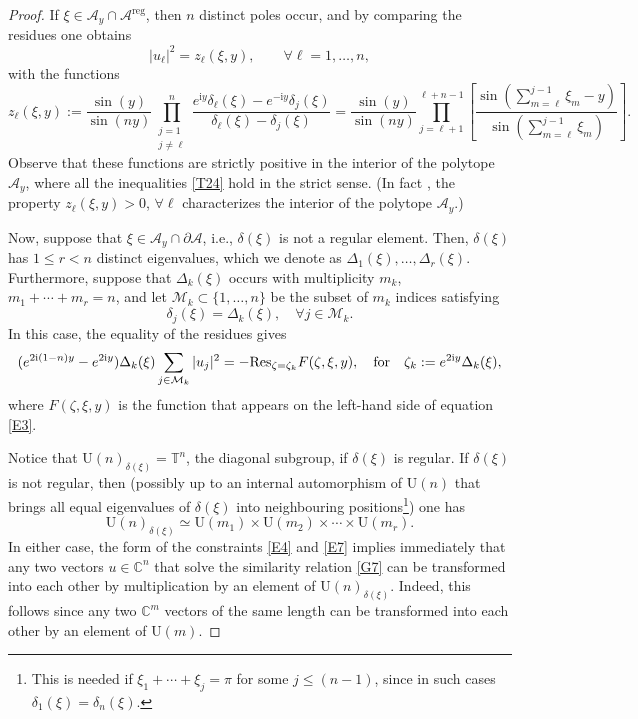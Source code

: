 \documentclass[a4paper,11pt,reqno]{amsart}
\theoremstyle{definition}
\numberwithin{equation}{section}
\newcommand{\be}{\begin{equation}}
\newcommand{\ee}{\end{equation}}
\def\cA{{\mathcal A}}                       %
\def\bT{{\mathbb T}}                        %
\def\reg{\mathrm{reg}}                      %
\def\ri{{\mathrm{i}}}                       %
\def\bC{{\mathbb C}}                        %
\def\U{\mathrm{U}}                          %
\def\reg{\mathrm{reg}}                      %
\def\cM{{\mathcal M}}                       %
\begin{document}
\begin{proof}
If $\xi \in \cA_y \cap \cA^\reg$, then $n$ distinct poles occur, and by comparing the residues one obtains
\be
\vert u_\ell \vert^2 = z_\ell(\xi,y), \qquad \forall \ell=1,\dots, n,
\label{E4}\ee
with the functions
\be
z_\ell(\xi,y) :=
      \frac{\sin(y)}{\sin(ny)}
      \prod^n_{\substack{j=1\\j \neq \ell}} \frac{e^{\ri y}\delta_\ell(\xi) - e^{-\ri y}\delta_j(\xi)}
                           {\delta_\ell(\xi) - \delta_j(\xi)}= \frac{\sin(y)}{\sin(ny)}
\prod_{j=\ell+1}^{\ell+ n-1}
\left[  \frac{\sin(\sum_{m=\ell}^{j-1}\xi_m - y)}{\sin(\sum_{m=\ell}^{j-1} \xi_m)} \right].
\label{E5}\ee
Observe that these functions are strictly positive in the interior of the polytope $\cA_y$, where all the inequalities \eqref{T24}
hold in the strict sense. (In fact \cite{FK}, the property $z_\ell(\xi,y)>0$, $\forall \ell$ characterizes the interior of the polytope $\cA_y$.)

Now, suppose that $\xi \in \cA_y \cap \partial \cA$, i.e., $\delta(\xi)$ is not a regular element.
Then, $\delta(\xi)$ has $1\leq r<n$ distinct eigenvalues, which we denote
as $\Delta_1(\xi),\dots, \Delta_r(\xi)$.
Furthermore, suppose that $\Delta_k(\xi)$ occurs with multiplicity $m_k$, $m_1+\cdots + m_r=n$,
 and let $\cM_k \subset \{1,\dots, n\}$ be the subset of $m_k$ indices satisfying
\be
\delta_j(\xi) = \Delta_k(\xi), \quad \forall j\in \cM_k.
\label{E6}\ee
In this case, the equality of the residues gives
 \be
(e^{2\ri(1-n) y}-e^{2\ri y})\Delta_k(\xi)  \sum_{j \in \cM_k}\vert u_j \vert^2 =
-\mathrm{Res}_{\zeta=\zeta_k} F(\zeta, \xi, y), \quad \hbox{for}\quad \zeta_k :=  e^{2\ri y} \Delta_k(\xi),
\label{E7}\ee
where $F(\zeta,\xi,y)$ is the function that appears on the left-hand side of equation \eqref{E3}.

Notice that $\U(n)_{\delta(\xi)} = \bT^n$, the diagonal subgroup, if $\delta(\xi)$ is regular.
If $\delta(\xi)$ is not regular, then (possibly up to an internal automorphism of $\U(n)$ that
brings all equal eigenvalues of $\delta(\xi)$  into neighbouring positions\footnote{This is needed if
$\xi_1+ \cdots + \xi_j =\pi$ for some $j\leq (n-1)$, since in such cases $\delta_1(\xi) = \delta_n(\xi)$.}) one has
\be
\U(n)_{\delta(\xi)} \simeq \U(m_1) \times \U(m_2) \times \cdots \times \U(m_r).
\label{E8}\ee
In either case, the form of the constraints \eqref{E4}  and \eqref{E7} implies immediately that any two vectors
$u\in \bC^n$ that solve the similarity relation \eqref{G7}
can be transformed into each other by multiplication by an element of $\U(n)_{\delta(\xi)}$.
Indeed, this follows since any two $\bC^m$ vectors of the same length can be transformed into each other
by an element of $\U(m)$.
\end{proof}
\end{document}
